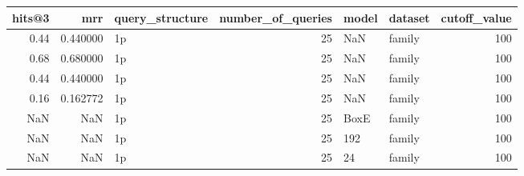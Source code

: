 \begin{tabular}{rrlrllr}
\toprule
 hits@3 &      mrr & query\_structure &  number\_of\_queries & model & dataset &  cutoff\_value \\
\midrule
   0.44 & 0.440000 &              1p &                 25 &   NaN &  family &           100 \\
   0.68 & 0.680000 &              1p &                 25 &   NaN &  family &           100 \\
   0.44 & 0.440000 &              1p &                 25 &   NaN &  family &           100 \\
   0.16 & 0.162772 &              1p &                 25 &   NaN &  family &           100 \\
    NaN &      NaN &              1p &                 25 &  BoxE &  family &           100 \\
    NaN &      NaN &              1p &                 25 &   192 &  family &           100 \\
    NaN &      NaN &              1p &                 25 &    24 &  family &           100 \\
\bottomrule
\end{tabular}

